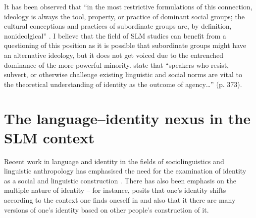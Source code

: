 It has been observed that ``in the most restrictive formulations of this connection, ideology is always the tool, property, or practice of dominant social groups; the cultural conceptions and practices of subordinate groups are, by definition, nonideolgical'' \citep[7]{Woolard1998}. I believe that the field of SLM studies can benefit from a questioning of this position as it is possible that subordinate groups might have an alternative ideology, but it does not get voiced due to the entrenched dominance of the more powerful minority. \citet{BucholtzEtAl2004} state that ``speakers who resist, subvert, or otherwise challenge existing linguistic and social norms are vital to the theoretical understanding of identity as the outcome of agency{\dots}'' (p. 373).

\section{The language--identity nexus in the SLM context} %

Recent work in language and identity in the fields of sociolinguistics and linguistic anthropology has emphasised the need for the examination of identity as a social and linguistic construction \citep{BucholtzEtAl2004,Joseph2004}. There has also been emphasis on the multiple nature of identity -- for instance, \citet{Joseph2004} posits that one's identity shifts according to the context one finds oneself in and also that it there are many versions of one's identity based on other people's construction of it. 

